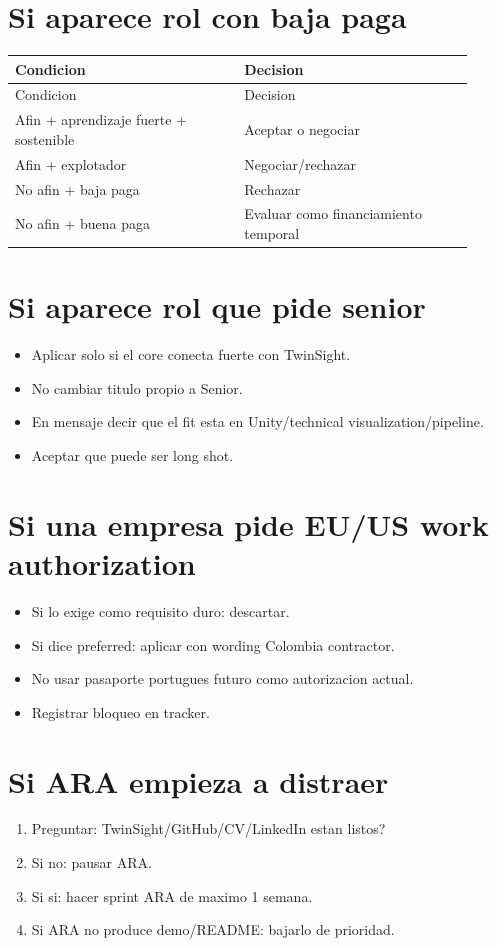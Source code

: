 \section{Si aparece rol con baja paga}


\begin{center}
\scriptsize
\begin{longtable}{>{\raggedright\arraybackslash}p{0.455\linewidth} >{\raggedright\arraybackslash}p{0.455\linewidth}}
\toprule
Condicion & Decision \\
\midrule
\endfirsthead
\toprule
Condicion & Decision \\
\midrule
\endhead
Afin + aprendizaje fuerte + sostenible & Aceptar o negociar \\
Afin + explotador & Negociar/rechazar \\
No afin + baja paga & Rechazar \\
No afin + buena paga & Evaluar como financiamiento temporal \\
\bottomrule
\end{longtable}
\end{center}



\section{Si aparece rol que pide senior}


\begin{itemize}
\item Aplicar solo si el core conecta fuerte con TwinSight.
\item No cambiar titulo propio a Senior.
\item En mensaje decir que el fit esta en Unity/technical visualization/pipeline.
\item Aceptar que puede ser long shot.
\end{itemize}


\section{Si una empresa pide EU/US work authorization}


\begin{itemize}
\item Si lo exige como requisito duro: descartar.
\item Si dice preferred: aplicar con wording Colombia contractor.
\item No usar pasaporte portugues futuro como autorizacion actual.
\item Registrar bloqueo en tracker.
\end{itemize}


\section{Si ARA empieza a distraer}


\begin{enumerate}
\item Preguntar: TwinSight/GitHub/CV/LinkedIn estan listos?
\item Si no: pausar ARA.
\item Si si: hacer sprint ARA de maximo 1 semana.
\item Si ARA no produce demo/README: bajarlo de prioridad.
\end{enumerate}
